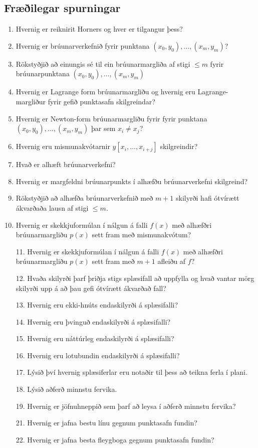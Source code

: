 \documentclass[icelandic,a4paper,12pt]{article}
\begin{document}
\subsection{Fræðilegar spurningar}
  \begin{enumerate}
  \item  Hvernig er reiknirit Horners og hver er tilgangur þess?
  \item  Hvernig er brúunarverkefnið fyrir punktana 
$(x_0,y_0),\dots,(x_m,y_m)$?
  \item  Rökstyðjið að einungis sé til ein brúunarmargliða 
af stigi $\leq m$ fyrir 
brúunarpunktana $(x_0,y_0),\dots,(x_m,y_m)$
  \item Hvernig er Lagrange form brúunarmargliðu og hvernig eru
    Lagrange-margliður fyrir gefið punktasafn skilgreindar?  
  \item  Hvernig er Newton-form brúunarmargliðu fyrir 
 fyrir punktana $(x_0,y_0),\dots,(x_m,y_m)$ þar sem
$x_i\neq x_j$?
  \item  Hvernig eru mismunakvótarnir $y[x_i,\ldots,x_{i+j}]$
    skilgreindir?
  \item Hvað er alhæft brúunarverkefni? 
  \item Hvernig er margfeldni brúunarpunkts í alhæfðu brúunarverkefni 
skilgreind?
  \item Rökstyðjið að alhæfða brúunarverkefnið með $m+1$ skilyrði
hafi ótvírætt ákvarðaða lausn af stigi $\leq m$.  
  \item  Hvernig er skekkjuformúlan í nálgun á falli $f(x)$ með alhæfðri
    brúunarmargliðu $p(x)$ sett fram með mismunakvótum?
  \end{enumerate}


 \begin{enumerate}
  \item [11.]  Hvernig er skekkjuformúlan í nálgun á falli $f(x)$ með alhæfðri
    brúunarmargliðu $p(x)$ sett fram með $m+1$ afleiðu af $f$?
  \item [12.]  Hvaða skilyrði þarf þriðja stigs splæsifall að uppfylla 
og hvað vantar mörg skilyrði upp á að þau gefi ótvírætt ákvarðað fall?
  \item  [13.] Hvernig eru ekki-hnúts endaskilyrði á splæsifalli?
  \item  [14.] Hvernig eru þvinguð endaskilyrði á splæsifalli?
  \item  [15.] Hvernig eru náttúrleg endaskilyrði á splæsifalli?
  \item  [16.] Hvernig eru lotubundin endaskilyrði á splæsifalli?
  \item  [17.] Lýsið því hvernig splæsiferlar eru notaðir til þess að
    teikna ferla í plani.
  \item  [18.] Lýsið aðferð minnstu fervika.  
  \item  [19.] Hvernig er jöfnuhneppið
    sem þarf að leysa í aðferð minnstu fervika?
  \item  [21.] Hvernig er jafna bestu línu gegnum punktasafn fundin?
  \item  [22.] Hvernig er jafna besta fleygboga gegnum punktasafn fundin?
   \end{enumerate}
\end{document}
